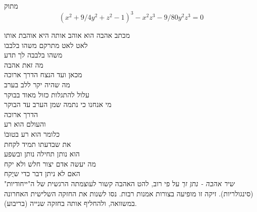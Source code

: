 \begin{surferPage}{מתוק}
\[(x^2+ 9/4y^2	+ z^2- 1)^3- x^2z^3	- 9/80y^2z^3	= 0\]

\singlespacing
מכתב אהבה
\singlespacing
הוא אוהב אותה היא אוהבת אותו\\
לאט לאט מתרקם משהו בלבבו\\
משהו בלבבה לך תדע\\
מה זאת אהבה\\
\singlespacing
מכאן ועד הנצח הדרך ארוכה\\
מה שהיה יקר ללב בערב\\
עלול להתגלות כזול מאוד בבוקר\\
מי אנחנו כי נתמה שמן הערב עד הבוקר\\
הדרך ארוכה\\
והעולם הוא רע\\
כלומר הוא רע בטוּבוֹ\\ את שבדעתו תמיד לקחת\\ הוא נותן תחילה נותן ובשפע\\
מה יעשה אדם יצור חלש ולא יקח\\ האם לא ניתן דבר כדי שיֻקח\\
{\it שיר אהבה - נתן זך}
\singlespacing 
על פי רוב, להט האהבה קשור לעוצמתה הרגשית של ה"ייחודיות" (סינגולריות). זיקה זו מופיעה בצורות אמנות רבות.
\singlespacing 
נסו לשנות את החזקה השלישית האחרונה במשוואה, ולהחליף אותה בחזקה שנייה (בריבוע).
\end{surferPage}
